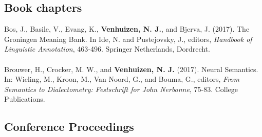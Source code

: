 \documentclass[a4paper,10pt]{article}
\begin{document}
\subsection*{Book chapters}

\noindent
    Bos, J., Basile, V., Evang, K., \textbf{Venhuizen, N. J.}, and Bjerva, J.
    (2017). The Groningen Meaning Bank. In Ide, N. and Pustejovsky, J.,
    editors, \textit{Handbook of Linguistic Annotation}, 463-496. Springer
    Netherlands, Dordrecht.\\
    \\
    Brouwer, H., Crocker, M. W., and \textbf{Venhuizen, N. J.} (2017). 
    Neural Semantics. In: Wieling, M., Kroon, M., Van Noord, G., and Bouma, G.,
    editors, \textit{From Semantics to Dialectometry: Festschrift for John
    Nerbonne}, 75-83. College Publications.

\subsection*{Conference Proceedings}
\end{document}
